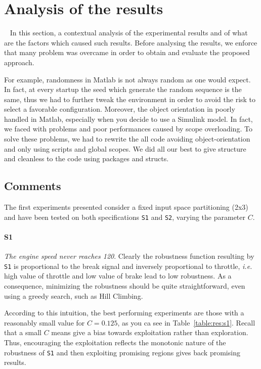 \documentclass[11pt]{article}
\begin{document}
\pagebreak

\section{Analysis of the results}~\label{sec:resan}
In this section, a contextual analysis of the experimental results and of what are the factors which caused such results.
Before analysing the results, we enforce that many problem was overcame in order to obtain and evaluate the proposed approach. 

For example, randomness in Matlab is not always random as one would expect. In fact, at every startup the seed which generate the random sequence is the same, thus we had to further tweak the environment in order to avoid the risk to select a favorable configuration. Moreover, the object orientation in poorly handled in Matlab, especially when you decide to use a Simulink model. In fact, we faced with problems and poor performances caused by scope overloading. To solve these
problems, we had to rewrite the all code avoiding object-orientation and only using scripts and global scopes. We did all our best to give structure and cleanless to the code using packages and structs. 

\subsection{Comments}
The first experiments presented consider a fixed input space partitioning (2x3) and have been tested on both specifications \texttt{S1} and \texttt{S2}, varying the parameter $C$.

\paragraph{S1} \textit{The engine speed never reaches 120}. Clearly the robustness function resulting by \texttt{S1} is proportional to the break signal and inversely proportional to throttle, \textit{i.e.} high value of throttle and low value of brake lead to low robustness.
As a consequence, minimizing the robustness should be quite straightforward, even using a greedy search, such as Hill Climbing.

According to this intuition, the best performing experiments are those with a reasonably small value for $C=0.125$, as you ca see in Table~\ref{table:res:s1}.
Recall that a small $C$ means give a bias towards exploitation rather than exploration. Thus, encouraging the exploitation reflects the monotonic nature of the robustness of \texttt{S1} and then exploiting promising regions gives back promising results.
\end{document}
